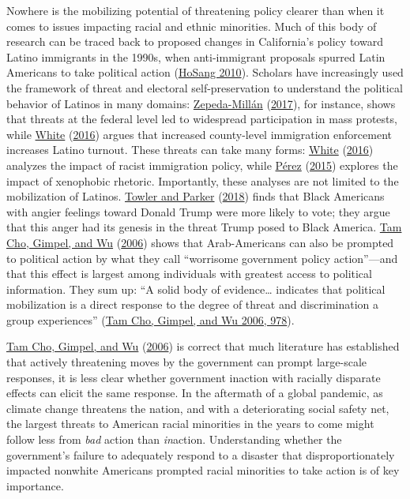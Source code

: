 \documentclass[
  12pt,
]{article}
\begin{document}
Nowhere is the mobilizing potential of threatening policy clearer than when it comes to issues impacting racial and ethnic minorities. Much of this body of research can be traced back to proposed changes in California's policy toward Latino immigrants in the 1990s, when anti-immigrant proposals spurred Latin Americans to take political action (\protect\hyperlink{ref-HoSang2010}{HoSang 2010}). Scholars have increasingly used the framework of threat and electoral self-preservation to understand the political behavior of Latinos in many domains: \protect\hyperlink{ref-Zepeda-Millan2017}{Zepeda-Millán} (\protect\hyperlink{ref-Zepeda-Millan2017}{2017}), for instance, shows that threats at the federal level led to widespread participation in mass protests, while \protect\hyperlink{ref-White2016}{White} (\protect\hyperlink{ref-White2016}{2016}) argues that increased county-level immigration enforcement increases Latino turnout. These threats can take many forms: \protect\hyperlink{ref-White2016}{White} (\protect\hyperlink{ref-White2016}{2016}) analyzes the impact of racist immigration policy, while \protect\hyperlink{ref-Perez2015}{Pérez} (\protect\hyperlink{ref-Perez2015}{2015}) explores the impact of xenophobic rhetoric. Importantly, these analyses are not limited to the mobilization of Latinos. \protect\hyperlink{ref-Towler2018}{Towler and Parker} (\protect\hyperlink{ref-Towler2018}{2018}) finds that Black Americans with angier feelings toward Donald Trump were more likely to vote; they argue that this anger had its genesis in the threat Trump posed to Black America. \protect\hyperlink{ref-TamCho2006a}{Tam Cho, Gimpel, and Wu} (\protect\hyperlink{ref-TamCho2006a}{2006}) shows that Arab-Americans can also be prompted to political action by what they call ``worrisome government policy action''---and that this effect is largest among individuals with greatest access to political information. They sum up: ``A solid body of evidence\ldots{} indicates that political mobilization is a direct response to the degree of threat and discrimination a group experiences'' (\protect\hyperlink{ref-TamCho2006a}{Tam Cho, Gimpel, and Wu 2006, 978}).

\protect\hyperlink{ref-TamCho2006a}{Tam Cho, Gimpel, and Wu} (\protect\hyperlink{ref-TamCho2006a}{2006}) is correct that much literature has established that actively threatening moves by the government can prompt large-scale responses, it is less clear whether government inaction with racially disparate effects can elicit the same response. In the aftermath of a global pandemic, as climate change threatens the nation, and with a deteriorating social safety net, the largest threats to American racial minorities in the years to come might follow less from \emph{bad} action than \emph{in}action. Understanding whether the
government's failure to adequately respond to a disaster that disproportionately impacted nonwhite Americans prompted racial minorities to take action is of key importance.
\end{document}
